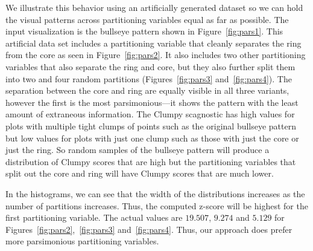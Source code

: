 We illustrate this behavior using an artificially generated dataset so we can hold the visual patterns across partitioning variables equal as far as possible. The input visualization is the bullseye pattern shown in Figure~\ref{fig:pars1}. This artificial data set includes a partitioning variable that cleanly separates the ring from the core as seen in Figure~\ref{fig:pars2}. It also includes two other partitioning variables that also separate the ring and core, but they also further split them into two and four random partitions (Figures~\ref{fig:pars3} and~\ref{fig:pars4}). The separation between the core and ring are equally visible in all three variants, however the first is the most parsimonious---it shows the pattern with the least amount of extraneous information. 
The Clumpy scagnostic has high values for plots with multiple tight clumps of points such as the original bullseye pattern but low values for plots with just one clump such as those with just the core or just the ring. So random samples of the bullseye pattern will produce a distribution of Clumpy scores that are high but the partitioning variables that split out the core and ring will have Clumpy scores that are much lower.

In the histograms, we can see that the width of the distributions increases as the number of partitions increases. Thus, the computed z-score will be highest for the first partitioning variable. The actual values are $19.507$, $9.274$ and $5.129$ for Figures~\ref{fig:pars2},~\ref{fig:pars3} and~\ref{fig:pars4}. Thus, our approach does prefer more parsimonious partitioning variables.

